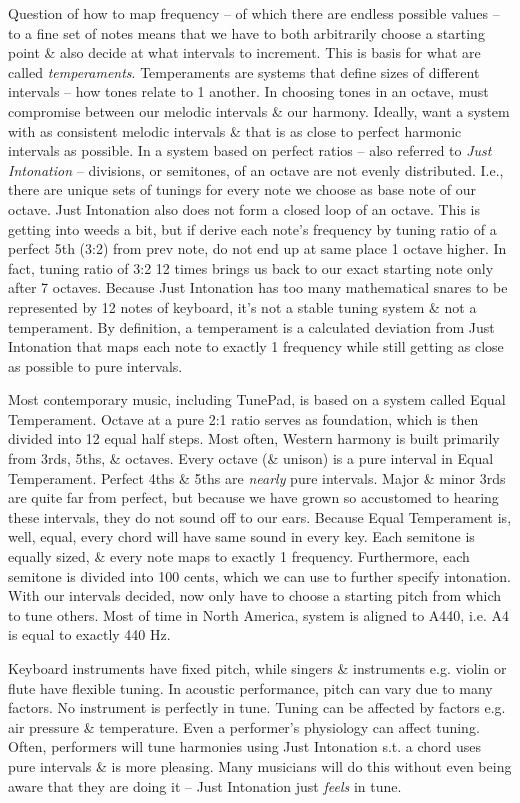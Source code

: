 \documentclass{article}
\begin{document}
\begin{itemize}
\begin{itemize}
		Question of how to map frequency -- of which there are endless possible values -- to a fine set of notes means that we have to both arbitrarily choose a starting point \& also decide at what intervals to increment. This is basis for what are called {\it temperaments}. Temperaments are systems that define sizes of different intervals -- how tones relate to 1 another. In choosing tones in an octave, must compromise between our melodic intervals \& our harmony. Ideally, want a system with as consistent melodic intervals \& that is as close to perfect harmonic intervals as possible. In a system based on perfect ratios -- also referred to {\it Just Intonation} -- divisions, or semitones, of an octave are not evenly distributed. I.e., there are unique sets of tunings for every note we choose as base note of our octave. Just Intonation also does not form a closed loop of an octave. This is getting into weeds a bit, but if derive each note's frequency by tuning ratio of a perfect 5th (3:2) from prev note, do not end up at same place 1 octave higher. In fact, tuning ratio of 3:2 12 times brings us back to our exact starting note only after 7 octaves. Because Just Intonation has too many mathematical snares to be represented by 12 notes of keyboard, it's not a stable tuning system \& not a temperament. By definition, a temperament is a calculated deviation from Just Intonation that maps each note to exactly 1 frequency while still getting as close as possible to pure intervals.
		
		Most contemporary music, including TunePad, is based on a system called Equal Temperament. Octave at a pure 2:1 ratio serves as foundation, which is then divided into 12 equal half steps. Most often, Western harmony is built primarily from 3rds, 5ths, \& octaves. Every octave (\& unison) is a pure interval in Equal Temperament. Perfect 4ths \& 5ths are {\it nearly} pure intervals. Major \& minor 3rds are quite far from perfect, but because we have grown so accustomed to hearing these intervals, they do not sound off to our ears. Because Equal Temperament is, well, equal, every chord will have same sound in every key. Each semitone is equally sized, \& every note maps to exactly 1 frequency. Furthermore, each semitone is divided into 100 cents, which we can use to further specify intonation. With our intervals decided, now only have to choose a starting pitch from which to tune others. Most of time in North America, system is aligned to A440, i.e. A4 is equal to exactly 440 Hz.
		
		Keyboard instruments have fixed pitch, while singers \& instruments e.g. violin or flute have flexible tuning. In acoustic performance, pitch can vary due to many factors. No instrument is perfectly in tune. Tuning can be affected by factors e.g. air pressure \& temperature. Even a performer's physiology can affect tuning. Often, performers will tune harmonies using Just Intonation s.t. a chord uses pure intervals \& is more pleasing. Many musicians will do this without even being aware that they are doing it -- Just Intonation just {\it feels} in tune.
		

\end{itemize}
\end{itemize}
\end{document}
